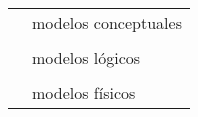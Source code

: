 \documentclass[preview]{standalone}
\begin{document}
\sf
\begin{tabular}{ll}
	& modelos conceptuales\\
 & \\
	\parbox[c]{4pt}{}
 & modelos lógicos\\
 & \\
 & modelos físicos
\end{tabular}
\end{document}
